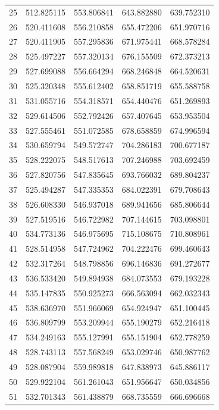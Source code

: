 \begin{table}
\begin{tabular}{rrrrr}
25 & 512.825115 & 553.806841 & 643.882880 & 639.752310 \\
26 & 520.411608 & 556.210858 & 655.472206 & 651.970716 \\
27 & 520.411905 & 557.295836 & 671.975441 & 668.578284 \\
28 & 525.497227 & 557.320134 & 676.155509 & 672.373213 \\
29 & 527.699088 & 556.664294 & 668.246848 & 664.520631 \\
30 & 525.320348 & 555.612402 & 658.851719 & 655.588758 \\
31 & 531.055716 & 554.318571 & 654.440476 & 651.269893 \\
32 & 529.614506 & 552.792426 & 657.407645 & 653.953504 \\
33 & 527.555461 & 551.072585 & 678.658859 & 674.996594 \\
34 & 530.659794 & 549.572747 & 704.286183 & 700.677187 \\
35 & 528.222075 & 548.517613 & 707.246988 & 703.692459 \\
36 & 527.820756 & 547.835645 & 693.766032 & 689.804237 \\
37 & 525.494287 & 547.335353 & 684.022391 & 679.708643 \\
38 & 526.608330 & 546.937018 & 689.941656 & 685.806644 \\
39 & 527.519516 & 546.722982 & 707.144615 & 703.098801 \\
40 & 534.773136 & 546.975695 & 715.108675 & 710.808961 \\
41 & 528.514958 & 547.724962 & 704.222476 & 699.460643 \\
42 & 532.317264 & 548.798856 & 696.146836 & 691.272677 \\
43 & 536.533420 & 549.894938 & 684.073553 & 679.193228 \\
44 & 535.147835 & 550.925273 & 666.563094 & 662.032343 \\
45 & 538.636970 & 551.966069 & 654.924947 & 651.100445 \\
46 & 536.809799 & 553.209944 & 655.190279 & 652.216418 \\
47 & 534.249163 & 555.127991 & 655.151904 & 652.778259 \\
48 & 528.743113 & 557.568249 & 653.029746 & 650.987762 \\
49 & 528.087904 & 559.989818 & 647.838973 & 645.886117 \\
50 & 529.922104 & 561.261043 & 651.956647 & 650.034856 \\
51 & 532.701343 & 561.438879 & 668.735559 & 666.696668 \\

\end{tabular}
\end{table}
